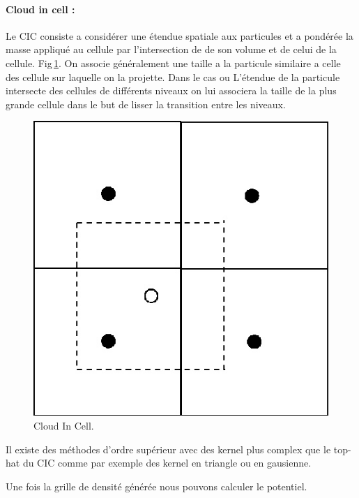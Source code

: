 \paragraph{Cloud in cell : } Le CIC consiste a considérer une étendue spatiale aux particules et a pondérée la masse appliqué au cellule par l'intersection de de son volume et de celui de la cellule.
Fig\,\ref{fig:CIC}.
On associe généralement une taille a la particule similaire a celle des cellule sur laquelle on la projette.
Dans le cas ou L’étendue de la particule intersecte des cellules de différents niveaux on lui associera la taille de la plus grande cellule dans le but de lisser la transition entre les niveaux.


\begin{figure}[bth]
        \includegraphics[width=.95\linewidth]{img/02/CIC.jpg} 
        \caption{Cloud In Cell. 
}
 		\label{fig:CIC}
\end{figure}

Il existe des méthodes d'ordre supérieur avec des kernel plus complex que le top-hat du CIC comme par exemple des kernel en triangle ou en gausienne.

Une fois la grille de densité générée nous pouvons calculer le potentiel.

